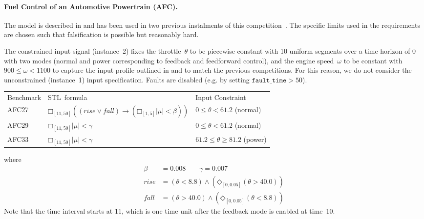 \documentclass[a4paper]{easychair}
\newcommand{\falsify}{falsify\xspace}
\begin{document}

	\paragraph{Fuel Control of an Automotive Powertrain (AFC).}

	The model is described in \cite{JinHSCC2014} and has been used in
    two previous instalments of this
    competition~\cite{ARCH17falsification,ARCH18falsification}.  The
    specific limits used in the requirements are chosen such that
    falsification is possible but reasonably hard.

	The constrained input signal (instance~2) fixes the
    throttle~$\theta$ to be piecewise constant with 10 uniform
    segments over a time horizon of 0 with two modes (normal and power
    corresponding to feedback and feedforward control), and the engine
    speed~$\omega$ to be constant with $900 \le \omega < 1100$ to
    capture the input profile outlined in \cite{JinHSCC2014} and to
    match the previous competitions.  For this reason, we do not
    consider the unconstrained (instance~1) input specification.
    Faults are disabled (e.g. by setting $\mathtt{fault\_time} > 50$).

	\begin{tabular}{lll}
		\toprule
		Benchmark & STL~formula & Input Constraint \\
		\cmidrule(r){1-1} \cmidrule(lr){2-2} \cmidrule(l){3-3}
		AFC27 & $□_{[11, 50]} ((\mathit{rise} \lor \mathit{fall}) \to (□_{[1,5]} |\mu| < \beta))$ & $0 \le \theta < 61.2$ (normal) \\
		AFC29 & $□_{[11, 50]} |\mu| < \gamma$ & $0 \le \theta < 61.2$ (normal) \\
		AFC33 & $□_{[11, 50]} |\mu| < \gamma$ & $61.2 \le \theta \ge 81.2$ (power) \\
		\bottomrule
	\end{tabular}

\noindent where
	\begin{align*}
		\beta &= 0.008 \qquad \gamma = 0.007 \\
		\mathit{rise} &= (\theta <  8.8) \land (◇_{[0, 0.05]} (\theta > 40.0))\\
		\mathit{fall} &= (\theta > 40.0) \land (◇_{[0, 0.05]} (\theta <  8.8))
	\end{align*}
	Note that the time interval starts at 11, which is one time unit after the feedback mode is enabled at time~10.
\end{document}
